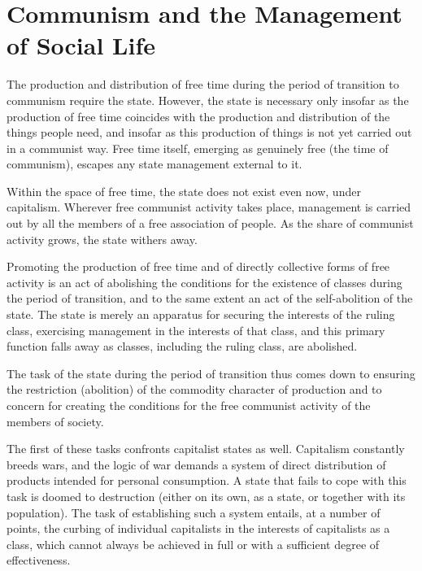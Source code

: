 \documentclass[../main]{subfiles}
\begin{document}
\ifSubfilesClassLoaded{\setcounter{page}{40}}{}
\section{Communism and the Management of Social Life}
\label{sec:07_communism_management}

The production and distribution of free time during the period of transition to communism require the state. However, the state is necessary only insofar as the production of free time coincides with the production and distribution of the things people need, and insofar as this production of things is not yet carried out in a communist way. Free time itself, emerging as genuinely free (the time of communism), escapes any state management external to it.

Within the space of free time, the state does not exist even now, under capitalism. Wherever free communist activity takes place, management is carried out by all the members of a free association of people. As the share of communist activity grows, the state withers away.

Promoting the production of free time and of directly collective forms of free activity is an act of abolishing the conditions for the existence of classes during the period of transition, and to the same extent an act of the self-abolition of the state. The state is merely an apparatus for securing the interests of the ruling class, exercising management in the interests of that class, and this primary function falls away as classes, including the ruling class, are abolished.

The task of the state during the period of transition thus comes down to ensuring the restriction (abolition) of the commodity character of production and to concern for creating the conditions for the free communist activity of the members of society.

The first of these tasks confronts capitalist states as well. Capitalism constantly breeds wars, and the logic of war demands a system of direct distribution of products intended for personal consumption. A state that fails to cope with this task is doomed to destruction (either on its own, as a state, or together with its population). The task of establishing such a system entails, at a number of points, the curbing of individual capitalists in the interests of capitalists as a class, which cannot always be achieved in full or with a sufficient degree of effectiveness.
\end{document}
